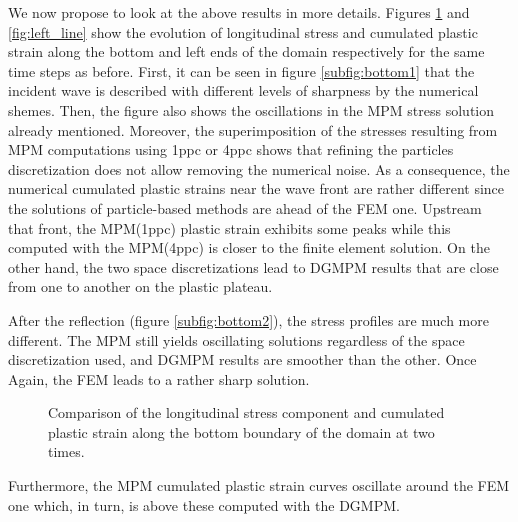 We now propose to look at the above results in more details.
Figures \ref{fig:bottom_line} and \ref{fig:left_line} show the evolution of longitudinal stress and cumulated plastic strain along the bottom and left ends of the domain respectively for the same time steps as before.
First, it can be seen in figure \ref{subfig:bottom1} that the incident wave is described with different levels of sharpness by the numerical shemes.
Then, the figure also shows the oscillations in the MPM stress solution already mentioned.
Moreover, the superimposition of the stresses resulting from MPM computations using 1ppc or 4ppc shows that refining the particles discretization does not allow removing the numerical noise.
As a consequence, the numerical cumulated plastic strains near the wave front are rather different since the solutions of particle-based methods are ahead of the FEM one.
Upstream that front, the MPM(1ppc) plastic strain exhibits some peaks while this computed with the MPM(4ppc) is closer to the finite element solution.
On the other hand, the two space discretizations lead to DGMPM results that are close from one to another on the plastic plateau.

After the reflection (figure \ref{subfig:bottom2}), the stress profiles are much more different.
The MPM still yields oscillating solutions regardless of the space discretization used, and DGMPM results are smoother than the other.
Once Again, the FEM leads to a rather sharp solution.
\begin{figure}[ht]
  \centering
  {}
  {}
  
  \caption{Comparison of the longitudinal stress component and cumulated plastic strain along the bottom boundary of the domain at two times.}
  \label{fig:bottom_line}
\end{figure}
Furthermore, the MPM cumulated plastic strain curves oscillate around the FEM one which, in turn, is above these computed with the DGMPM.

